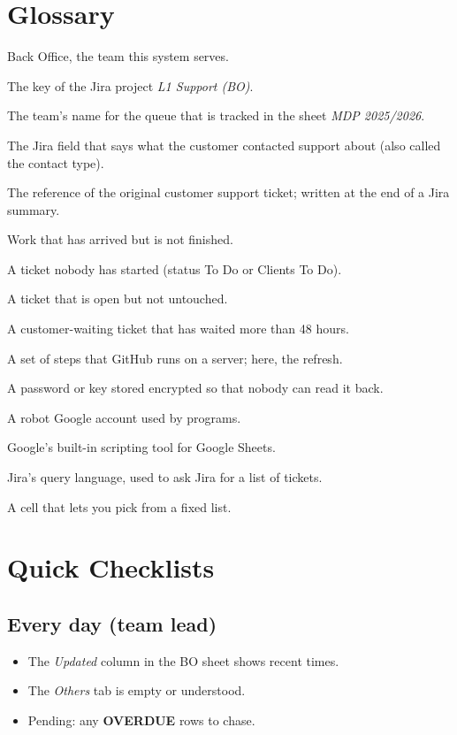\documentclass[11pt,a4paper]{article}
\let\oldsection\section
\renewcommand{\section}{\needspace{12\baselineskip}\oldsection}
\let\oldsubsection\subsection
\renewcommand{\subsection}{\needspace{7\baselineskip}\oldsubsection}
\begin{document}
\clearpage
\appendix

\section{Glossary}
\begin{description}[leftmargin=!,labelwidth=3.6cm]
  \item[BO] Back Office, the team this system serves.
  \item[L1] The key of the Jira project \emph{L1 Support (BO)}.
  \item[MDB / MDP] The team's name for the queue that is tracked in the sheet \emph{MDP 2025/2026}.
  \item[Request Type] The Jira field that says what the customer contacted support about (also called the contact type).
  \item[Customer ticket (CCS)] The reference of the original customer support ticket; written at the end of a Jira
    summary.
  \item[Backlog] Work that has arrived but is not finished.
  \item[Untouched] A ticket nobody has started (status To Do or Clients To Do).
  \item[Pending] A ticket that is open but not untouched.
  \item[Overdue] A customer-waiting ticket that has waited more than 48 hours.
  \item[Workflow] A set of steps that GitHub runs on a server; here, the refresh.
  \item[Secret] A password or key stored encrypted so that nobody can read it back.
  \item[Service account] A robot Google account used by programs.
  \item[Apps Script] Google's built-in scripting tool for Google Sheets.
  \item[JQL] Jira's query language, used to ask Jira for a list of tickets.
  \item[Dropdown] A cell that lets you pick from a fixed list.
\end{description}

\section{Quick Checklists}
\subsection*{Every day (team lead)}
\begin{itemize}[label=$\square$]
  \item The \emph{Updated} column in the BO sheet shows recent times.
  \item The \emph{Others} tab is empty or understood.
  \item Pending: any \textbf{OVERDUE} rows to chase.
\end{itemize}
\end{document}
